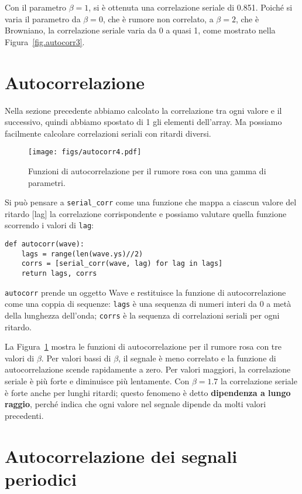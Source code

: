\documentclass[12pt,a4paper]{book}
\begin{document}
Con il parametro $\beta=1$, si è ottenuta una correlazione seriale di 0.851. Poiché si varia il parametro da $\beta=0$, che è rumore non correlato, a $\beta=2$, che è Browniano, la correlazione seriale varia da 0 a quasi 1, come mostrato nella Figura~\ref{fig.autocorr3}.

\section{Autocorrelazione} \label{autopink} 

Nella sezione precedente abbiamo calcolato la correlazione tra ogni valore e il successivo, quindi abbiamo spostato di 1 gli elementi dell'array. Ma possiamo facilmente calcolare correlazioni seriali con ritardi diversi.

\begin{figure} 

\centerline{\texttt{[image: figs/autocorr4.pdf]}} \caption{Funzioni di autocorrelazione per il rumore rosa con una gamma di parametri.} \label{fig.autocorr4} \end{figure} 

Si può pensare a \verb"serial_corr" come una funzione che mappa a ciascun valore del ritardo [lag] la correlazione corrispondente e possiamo valutare quella funzione scorrendo i valori di {\tt lag}:

\begin{verbatim} 
def autocorr(wave):
    lags = range(len(wave.ys)//2)
    corrs = [serial_corr(wave, lag) for lag in lags]
    return lags, corrs
 \end{verbatim} 

{\tt autocorr} prende un oggetto Wave e restituisce la funzione di autocorrelazione come una coppia di sequenze: {\tt lags} è una sequenza di numeri interi da 0 a metà della lunghezza dell'onda; {\tt corrs} è la sequenza di correlazioni seriali per ogni ritardo.

La Figura~\ref{fig.autocorr4} mostra le funzioni di autocorrelazione per il rumore rosa con tre valori di $\beta$. Per valori bassi di $\beta$, il segnale è meno correlato e la funzione di autocorrelazione scende rapidamente a zero. Per valori maggiori, la correlazione seriale è più forte e diminuisce più lentamente. Con $\beta=1.7$ la correlazione seriale è forte anche per lunghi ritardi; questo fenomeno è detto {\bf dipendenza a lungo raggio}, perché indica che ogni valore nel segnale dipende da molti valori precedenti.

\section{Autocorrelazione dei segnali periodici} 
\end{document}
